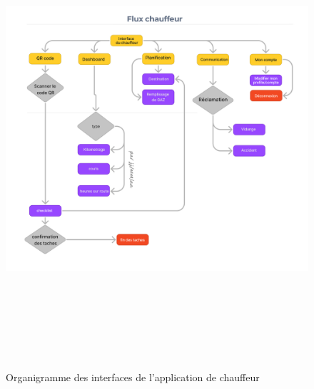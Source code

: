 \begin{figure}[htbp]
  \centering
  \includegraphics[width=1.05\textwidth,height=17cm]{chap2.images/org chauffer.png}
  \caption{Organigramme des interfaces de l'application de chauffeur}
\end{figure}

